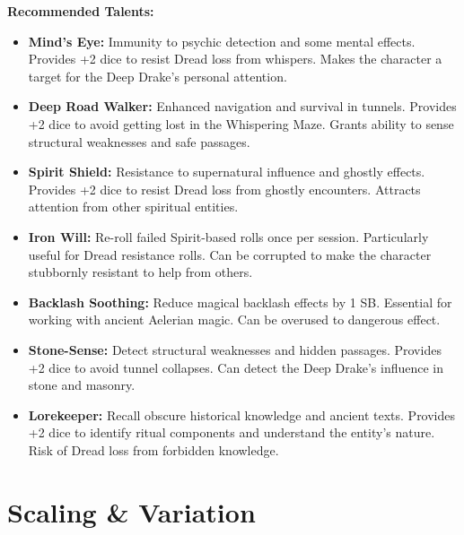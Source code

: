 \documentclass[11pt]{article}
\begin{document}
\textbf{Recommended Talents:}
\begin{itemize}
\item \textbf{Mind's Eye:} Immunity to psychic detection and some mental effects. Provides +2 dice to resist Dread loss from whispers. Makes the character a target for the Deep Drake's personal attention.
\item \textbf{Deep Road Walker:} Enhanced navigation and survival in tunnels. Provides +2 dice to avoid getting lost in the Whispering Maze. Grants ability to sense structural weaknesses and safe passages.
\item \textbf{Spirit Shield:} Resistance to supernatural influence and ghostly effects. Provides +2 dice to resist Dread loss from ghostly encounters. Attracts attention from other spiritual entities.
\item \textbf{Iron Will:} Re-roll failed Spirit-based rolls once per session. Particularly useful for Dread resistance rolls. Can be corrupted to make the character stubbornly resistant to help from others.
\item \textbf{Backlash Soothing:} Reduce magical backlash effects by 1 SB. Essential for working with ancient Aelerian magic. Can be overused to dangerous effect.
\item \textbf{Stone-Sense:} Detect structural weaknesses and hidden passages. Provides +2 dice to avoid tunnel collapses. Can detect the Deep Drake's influence in stone and masonry.
\item \textbf{Lorekeeper:} Recall obscure historical knowledge and ancient texts. Provides +2 dice to identify ritual components and understand the entity's nature. Risk of Dread loss from forbidden knowledge.
\end{itemize}

\section{Scaling \& Variation}
\end{document}
